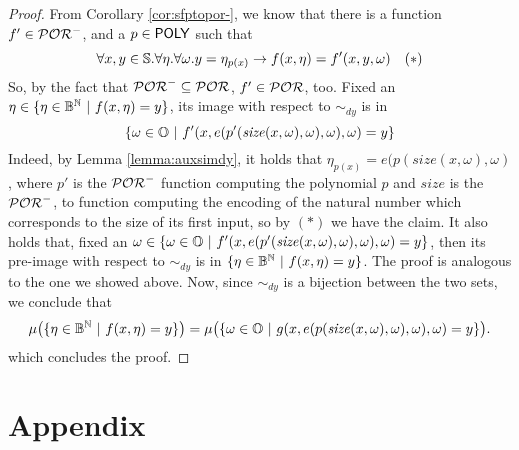 \begin{proof}
  From Corollary \ref{cor:sfptopor-}, we know that there is a function $f'\in \mathcal{POR}^-$,
  and a $p \in \mathsf{POLY}$ such that
  $$
  \forall x, y \in \mathbb{S}.\forall \eta.\forall \omega. y = \eta_{p(x)} \to  f(x, \eta) = f'(x, y, \omega)\quad (*)
  $$
  So, by the fact that $\mathcal{POR}^- \subseteq \mathcal{POR}$, $f' \in \mathcal{POR}$, too.
  Fixed an $\eta \in \{\eta \in \mathbb{B}^{\mathbb{N}} \ | \ f(x, \eta)=y \}$,
  its image with respect to $\sim_{\mathit{dy}}$
  is in
  $$
  \{\omega \in \mathbb{O} \ | \ f'(x, e(p'(\mathit{size}(x, \omega), \omega), \omega), \omega) =y\}
  $$
  Indeed, by Lemma \ref{lemma:auxsimdy}, it holds that
  $\eta_{p(x)} = e(p(\mathit{size}(x, \omega), \omega)$, where $p'$ is the $\mathcal{POR}^-$
  function computing the polynomial $p$ and $\mathit{size}$ is the $\mathcal{POR}^-$, to
  function computing the encoding of the natural number which corresponds to the
  size of its first input, so by $(*)$ we have the claim.
  It also holds that, fixed an $\omega \in \{\omega \in \mathbb{O} \ | \ f'(x, e(p'(\mathit{size}(x, \omega), \omega), \omega), \omega) =y\}$,
  then its pre-image with respect to $\sim_{\mathit{dy}}$ is in $\{\eta \in \mathbb{B}^{\mathbb{N}} \ | \ f(x, \eta)=y \}$.
  The proof is analogous to the one we showed above.
  Now, since $\sim_{\mathit{dy}}$ is a bijection between the two sets, we
  conclude that
  $$
  \mu\big(\{\eta \in \mathbb{B}^{\mathbb{N}} \ | \ f(x, \eta)=y \}\big)
  = \mu\big(\{\omega \in \mathbb{O} \ | \ g(x, e(p(\mathit{size}(x, \omega), \omega), \omega), \omega) =y\}\big).
  $$
  which concludes the proof.
\end{proof}



\newpage

\section{Appendix}\label{appendix}




